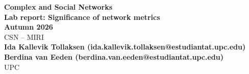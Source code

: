 \documentclass[12pt]{article}
\begin{document}
\begin{titlepage}
   \centering
   \vspace*{5cm}

   {\LARGE \textbf{Complex and Social Networks}} \\[1cm]

   {\large \textbf{Lab report: Significance of network metrics}} \\

   {\large \textbf{Autumn 2026}} \\[0.5cm]
   {\large CSN -- MIRI} \\[3cm]

   {\large \textbf{
   Ida Kallevik Tollaksen (ida.kallevik.tollaksen@estudiantat.upc.edu) \\
   Berdina van Eeden (berdina.van.eeden@estudiantat.upc.edu)}} \\[3cm]

   UPC  \\[2cm]

\end{titlepage}
\end{document}
